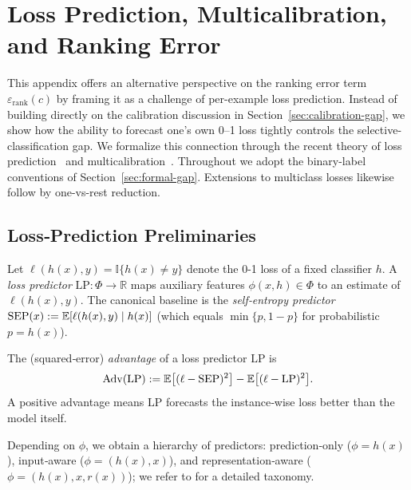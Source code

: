 \section{Loss Prediction, Multicalibration, and Ranking Error}
\label{app:loss-pred}

This appendix offers an alternative perspective on the ranking error term \(\varepsilon_{\text{rank}}(c)\) by framing it as a challenge of per-example loss prediction. Instead of building directly on the calibration discussion in Section~\ref{sec:calibration-gap}, we show how the ability to forecast one’s own 0--1 loss tightly controls the selective-classification gap. We formalize this connection through the recent theory of loss prediction~\citep{gollakota2025loss} and multicalibration~\citep{hebert2018multicalibration}. Throughout we adopt the binary-label conventions of Section~\ref{sec:formal-gap}. Extensions to multiclass losses likewise follow by one-vs-rest reduction.

\subsection{Loss‑Prediction Preliminaries}
\label{sec:loss_pred_prel}

Let \(\ell(h(x),y)=\mathbb{I}\{h(x)\neq y\}\) denote the 0-1 loss of a
fixed classifier \(h\).  A \emph{loss predictor}
\(\mathrm{LP}\colon\Phi\to\mathbb{R}\) maps auxiliary features
\(\phi(x,h)\in\Phi\) to an estimate of \(\ell(h(x),y)\).
The canonical baseline is the \emph{self‑entropy predictor}
\(\mathrm{SEP}(x):=\mathbb{E}[\ell(h(x),y)\mid h(x)]\)   %
(which equals \(\min\{p,1-p\}\) for probabilistic \(p=h(x)\)).

\begin{definition}
\label{def:advantage}
The (squared‑error) \emph{advantage} of a loss predictor \(\mathrm{LP}\) is
\begin{equation}
\mathrm{Adv}(\mathrm{LP})
:=\mathbb{E}\bigl[(\ell-\mathrm{SEP})^{2}\bigr]
  -\mathbb{E}\bigl[(\ell-\mathrm{LP})^{2}\bigr].
\end{equation}
A positive advantage means \(\mathrm{LP}\) forecasts the
instance‑wise loss better than the model itself.
\end{definition}

Depending on \(\phi\), we obtain a hierarchy of predictors:
prediction‑only (\(\phi=h(x)\)), input‑aware (\(\phi=(h(x),x)\)),
and representation‑aware (\(\phi=(h(x),x,r(x))\)); we refer to
\citet{gollakota2025loss} for a detailed taxonomy.


